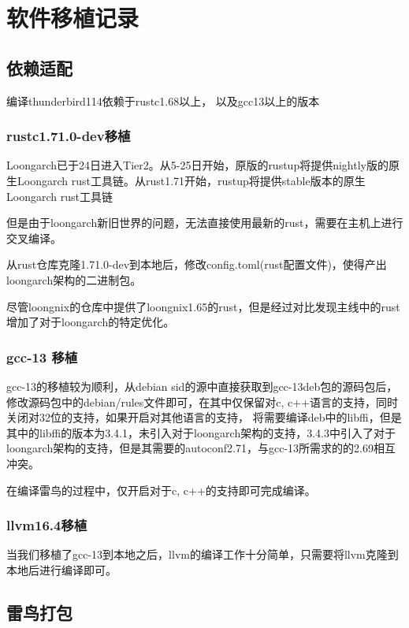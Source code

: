 \documentclass[lang=cn,a4paper,newtx]{elegantpaper}
\begin{document}
\section{软件移植记录}
\subsection{依赖适配}

编译thunderbird114依赖于rustc1.68以上， 以及gcc13以上的版本
\subsubsection{rustc1.71.0-dev移植}
Loongarch已于24日进入Tier2。从5-25日开始，原版的rustup将提供nightly版的原生Loongarch rust工具链。从rust1.71开始，rustup将提供stable版本的原生Loongarch rust工具链

但是由于loongarch新旧世界的问题，无法直接使用最新的rust，需要在主机上进行交叉编译。

从rust仓库克隆1.71.0-dev到本地后，修改config.toml(rust配置文件)，使得产出loongarch架构的二进制包。

尽管loongnix的仓库中提供了loongnix1.65的rust，但是经过对比发现主线中的rust增加了对于loongarch的特定优化。

\subsubsection{gcc-13 移植}

gcc-13的移植较为顺利，从debian sid的源中直接获取到gcc-13deb包的源码包后，修改源码包中的debian/rules文件即可，在其中仅保留对c, c++语言的支持，同时关闭对32位的支持，如果开启对其他语言的支持，
将需要编译deb中的libffi，但是其中的libffi的版本为3.4.1，未引入对于loongarch架构的支持，3.4.3中引入了对于loongarch架构的支持，但是其需要的autoconf2.71，与gcc-13所需求的的2.69相互冲突。

在编译雷鸟的过程中，仅开启对于c, c++的支持即可完成编译。

\subsubsection{llvm16.4移植}

当我们移植了gcc-13到本地之后，llvm的编译工作十分简单，只需要将llvm克隆到本地后进行编译即可。

\subsection{雷鸟打包}
\end{document}
